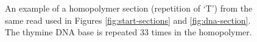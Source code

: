 \begin{figure}
\centering

\caption{\label{fig:homo-section}An example of a homopolymer section (repetition of `T') from the same read used in Figures \ref{fig:start-sections} and \ref{fig:dna-section}. The thymine DNA base is repeated 33 times in the homopolymer.}
\end{figure}
